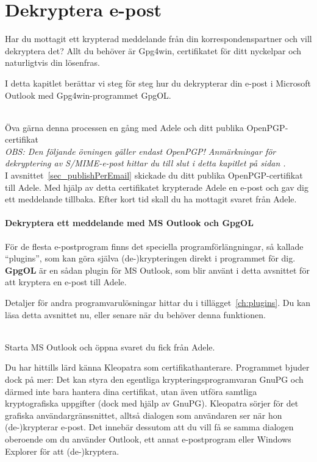 \documentclass[a4paper,11pt, oneside,openright,titlepage,dvips]{scrbook}
\newcommand\margin[1]{\marginline {\sffamily\scriptsize #1}}
\newcommand{\IncludeImage}[2][]{\texorhtml{%
\texttt{[image: \#2]}%
}{%
\htmlimg{#2.png}%
}}
\newcounter{part}
\newcounter{chapter}
\newcounter{section}[chapter]
\begin{document}
\chapter{Dekryptera e-post}
\label{ch:decrypt}

Har du mottagit ett krypterad meddelande från din
korrespondenspartner och vill dekryptera det?
Allt du behöver är Gpg4win, certifikatet för ditt
nyckelpar och naturligtvis din lösenfras.

I detta kapitlet berättar vi steg för steg hur du dekrypterar
din e-post i Microsoft Outlook med Gpg4win-programmet GpgOL.

~\\
Öva gärna denna processen en gång med Adele och ditt
publika OpenPGP-certifikat\\
\textit{OBS: Den följande övningen gäller endast OpenPGP!
Anmärkningar för dekryptering av S/MIME-e-post hittar du till slut
i detta kapitlet på sidan \pageref{encrypt-smime}.}
\T\margin{\IncludeImage[width=1.5cm]{openpgp-icon}}\\

I avsnittet~\ref{sec_publishPerEmail} skickade du ditt
publika OpenPGP-certifikat till Adele.
Med hjälp av detta certifikatet krypterade Adele en
e-post och gav dig ett meddelande tillbaka.
Efter kort tid skall du ha mottagit svaret från Adele.


\begin{center}
\IncludeImage{adele02}
\end{center}


\clearpage
\subsubsection{Dekryptera ett meddelande med MS Outlook och GpgOL}

För de flesta e-postprogram finns det speciella programförlängningar,
så kallade "`plugins"', som kan göra själva (de-)krypteringen direkt
i programmet för dig. \textbf{GpgOL} är en sådan plugin för MS Outlook,
som blir använt i detta avsnittet för att kryptera en e-post till Adele.

Detaljer för andra programvarulösningar hittar du i tillägget~\ref{ch:plugins}.
Du kan läsa detta avsnittet nu, eller senare när du behöver denna funktionen.

~\\
Starta MS Outlook och öppna svaret du fick från Adele.

Du har hittills lärd känna Kleopatra som certifikathanterare.
Programmet bjuder dock på mer: Det kan styra den egentliga krypteringsprogramvaran
GnuPG och därmed inte bara hantera dina certifikat, utan även utföra samtliga
kryptografiska uppgifter (dock med hjälp av GnuPG).
Kleopatra sörjer för det grafiska användargränssnittet, alltså dialogen som användaren
ser när hon (de-)krypterar e-post. Det innebär dessutom att du vill få se samma
dialogen oberoende om du använder Outlook, ett annat e-postprogram eller Windows
Explorer för att (de-)kryptera.
\end{document}
